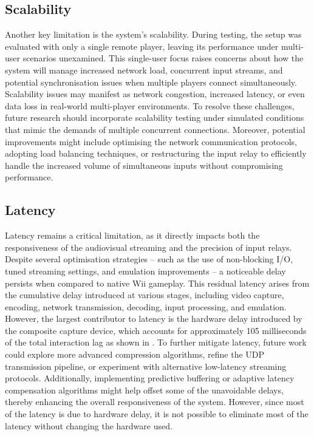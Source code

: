 \subsection{Scalability}

Another key limitation is the system’s scalability. During testing, the setup
was evaluated with only a single remote player, leaving its performance under
multi-user scenarios unexamined. This single-user focus raises concerns about
how the system will manage increased network load, concurrent input streams, and
potential synchronisation issues when multiple players connect simultaneously.
Scalability issues may manifest as network congestion, increased latency, or
even data loss in real-world multi-player environments. To resolve these
challenges, future research should incorporate scalability testing under
simulated conditions that mimic the demands of multiple concurrent connections.
Moreover, potential improvements might include optimising the network
communication protocols, adopting load balancing techniques, or restructuring
the input relay to efficiently handle the increased volume of simultaneous
inputs without compromising performance.

\subsection{Latency}

Latency remains a critical limitation, as it directly impacts both the
responsiveness of the audiovisual streaming and the precision of input relays.
Despite several optimisation strategies -- such as the use of non-blocking I/O,
tuned streaming settings, and emulation improvements -- a noticeable delay
persists when compared to native Wii gameplay. This residual latency arises from
the cumulative delay introduced at various stages, including video capture,
encoding, network transmission, decoding, input processing, and emulation.
However, the largest contributor to latency is the hardware delay introduced by the composite capture device, which accounts for approximately 105 milliseconds of the total
interaction lag as shown in . To further
mitigate latency, future work could explore more advanced compression
algorithms, refine the UDP transmission pipeline, or experiment with alternative
low-latency streaming protocols. Additionally, implementing predictive buffering
or adaptive latency compensation algorithms might help offset some of the
unavoidable delays, thereby enhancing the overall responsiveness of the system. However, since most
of the latency is due to hardware delay, it is not possible to eliminate most of the
latency without changing the hardware used.
